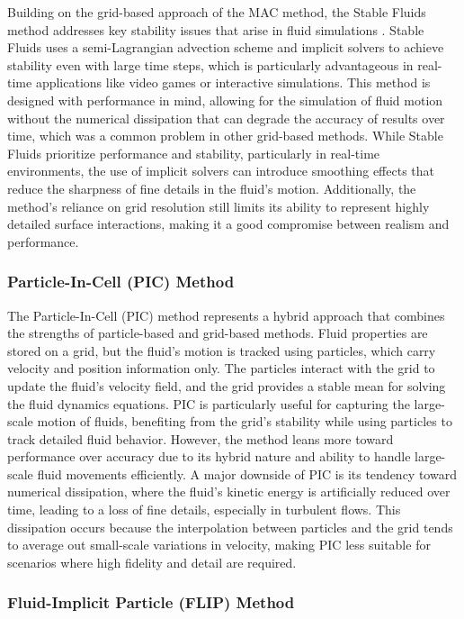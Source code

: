 Building on the grid-based approach of the MAC method, the Stable Fluids method addresses key stability issues that arise in fluid simulations \cite{Stam1999}. Stable Fluids uses a semi-Lagrangian advection scheme and implicit solvers to achieve stability even with large time steps, which is particularly advantageous in real-time applications like video games or interactive simulations. This method is designed with performance in mind, allowing for the simulation of fluid motion without the numerical dissipation that can degrade the accuracy of results over time, which was a common problem in other grid-based methods. While Stable Fluids prioritize performance and stability, particularly in real-time environments, the use of implicit solvers can introduce smoothing effects that reduce the sharpness of fine details in the fluid's motion. Additionally, the method's reliance on grid resolution still limits its ability to represent highly detailed surface interactions, making it a good compromise between realism and performance.

\subsubsection{Particle-In-Cell (PIC) Method}

The Particle-In-Cell (PIC) method represents a hybrid approach that combines the strengths of particle-based and grid-based methods. Fluid properties are stored on a grid, but the fluid's motion is tracked using particles, which carry velocity and position information only. The particles interact with the grid to update the fluid's velocity field, and the grid provides a stable mean for solving the fluid dynamics equations. PIC is particularly useful for capturing the large-scale motion of fluids, benefiting from the grid's stability while using particles to track detailed fluid behavior. However, the method leans more toward performance over accuracy due to its hybrid nature and ability to handle large-scale fluid movements efficiently. A major downside of PIC is its tendency toward numerical dissipation, where the fluid's kinetic energy is artificially reduced over time, leading to a loss of fine details, especially in turbulent flows. This dissipation occurs because the interpolation between particles and the grid tends to average out small-scale variations in velocity, making PIC less suitable for scenarios where high fidelity and detail are required.

\subsubsection{Fluid-Implicit Particle (FLIP) Method}


